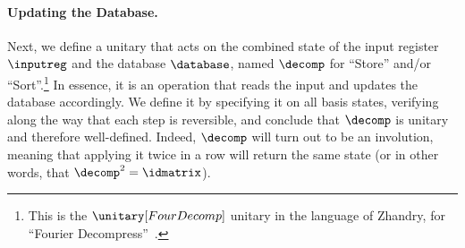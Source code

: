     \paragraph{Updating the Database.}
      Next, we define a unitary that acts on the combined state of the input
        register $\inputreg$ and the database $\database$,
        named $\decomp$ for ``Store'' and/or ``Sort''.\footnote{
          This is the $\unitary[FourDecomp]$ unitary in the language of Zhandry, 
          for ``Fourier Decompress''~\cite[App.~C]{C:Zhandry19}.
        } In essence, it is an operation that
        reads the input and updates the database accordingly.
        We define it by specifying it on all basis states, verifying along the
        way that each step is reversible, and conclude that $\decomp$ is 
        unitary and therefore well-defined. Indeed, $\decomp$ will turn out to be an involution, meaning
        that applying it twice in a row will return the same state (or in 
        other words, that $\decomp^2 = \idmatrix$).

